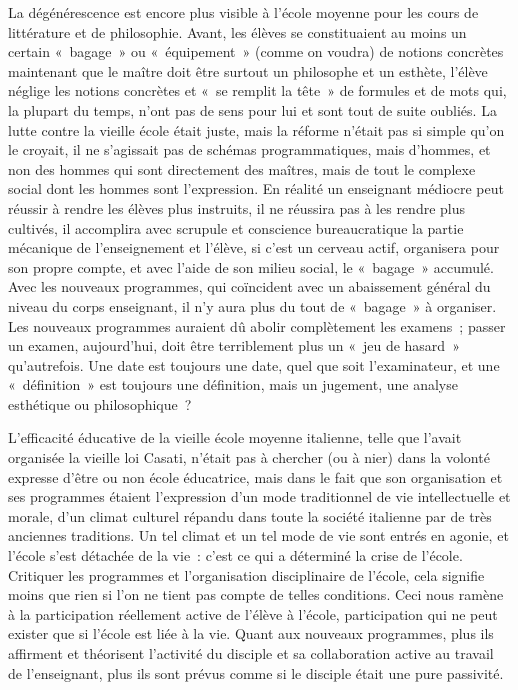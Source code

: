 \documentclass[french,twoside]{book} %
\begin{document}
La dégénérescence est encore plus visible à l’école moyenne pour les cours de littérature et de philosophie. Avant, les élèves se constituaient au moins un certain « bagage » ou « équipement » (comme on voudra) de notions concrètes maintenant que le maître doit être surtout un philosophe et un esthète, l’élève néglige les notions concrètes et « se remplit la tête » de formules et de mots qui, la plupart du temps, n’ont pas de sens pour lui et sont tout de suite oubliés. La lutte contre la vieille école était juste, mais la réforme n’était pas si simple qu’on le croyait, il ne s’agissait pas de schémas programmatiques, mais d’hommes, et non des hommes qui sont directement des maîtres, mais de tout le complexe social dont les hommes sont l’expression. En réalité un enseignant médiocre peut réussir à rendre les élèves plus instruits, il ne réussira pas à les rendre plus cultivés, il accomplira avec scrupule et conscience bureaucratique la partie mécanique de l’enseignement et l’élève, si c’est un cerveau actif, organisera pour son propre compte, et avec l’aide de son milieu social, le « bagage » accumulé. Avec les nouveaux programmes, qui coïncident avec un abaissement général du niveau du corps enseignant, il n’y aura plus du tout de « bagage » à organiser. Les nouveaux programmes auraient dû abolir complètement les examens ; passer un examen, aujourd’hui, doit être terriblement plus un « jeu de hasard » qu’autrefois. Une date est toujours une date, quel que soit l’examinateur, et une « définition » est toujours une définition, mais un jugement, une analyse esthétique ou philosophique ?\par
L'efficacité éducative de la vieille école moyenne italienne, telle que l’avait organisée la vieille loi Casati, n’était pas à chercher (ou à nier) dans la volonté expresse d’être ou non école éducatrice, mais dans le fait que son organisation et ses programmes étaient l’expression d’un mode traditionnel de vie intellectuelle et morale, d’un climat culturel répandu dans toute la société italienne par de très anciennes traditions. Un tel climat et un tel mode de vie sont entrés en agonie, et l’école s’est détachée de la vie : c’est ce qui a déterminé la crise de l’école. Critiquer les programmes et l’organisation disciplinaire de l’école, cela signifie moins que rien si l’on ne tient pas compte de telles conditions. Ceci nous ramène à la participation réellement active de l’élève à l’école, participation qui ne peut exister que si l’école est liée à la vie. Quant aux nouveaux programmes, plus ils affirment et théorisent l’activité du disciple et sa collaboration active au travail de l’enseignant, plus ils sont prévus comme si le disciple était une pure passivité.\par
\end{document}
